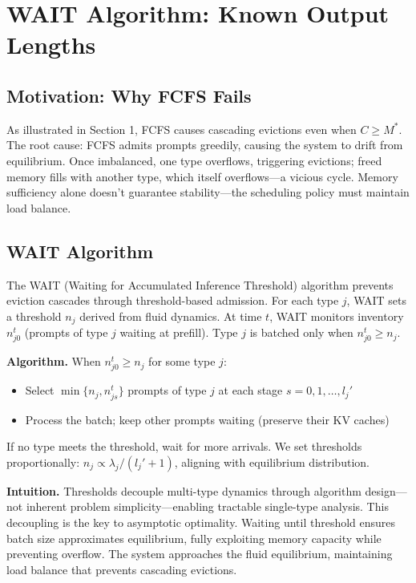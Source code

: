 \section{WAIT Algorithm: Known Output Lengths}

\subsection{Motivation: Why FCFS Fails}

As illustrated in Section 1, FCFS causes cascading evictions even when $C \geq M^*$. The root cause: FCFS admits prompts greedily, causing the system to drift from equilibrium. Once imbalanced, one type overflows, triggering evictions; freed memory fills with another type, which itself overflows—a vicious cycle. Memory sufficiency alone doesn't guarantee stability—the scheduling policy must maintain load balance.

\subsection{WAIT Algorithm}

The WAIT (Waiting for Accumulated Inference Threshold) algorithm prevents eviction cascades through threshold-based admission. For each type $j$, WAIT sets a threshold $n_j$ derived from fluid dynamics. At time $t$, WAIT monitors inventory $n_{j0}^t$ (prompts of type $j$ waiting at prefill). Type $j$ is batched only when $n_{j0}^t \geq n_j$.

\textbf{Algorithm.} When $n_{j0}^t \geq n_j$ for some type $j$:
\begin{itemize}
\item Select $\min\{n_j, n_{js}^t\}$ prompts of type $j$ at each stage $s = 0, 1, \dots, l_j'$
\item Process the batch; keep other prompts waiting (preserve their KV caches)
\end{itemize}

If no type meets the threshold, wait for more arrivals. We set thresholds proportionally: $n_j \propto \lambda_j / (l_j' + 1)$, aligning with equilibrium distribution.

\textbf{Intuition.} Thresholds decouple multi-type dynamics through algorithm design—not inherent problem simplicity—enabling tractable single-type analysis. This decoupling is the key to asymptotic optimality. Waiting until threshold ensures batch size approximates equilibrium, fully exploiting memory capacity while preventing overflow. The system approaches the fluid equilibrium, maintaining load balance that prevents cascading evictions.

